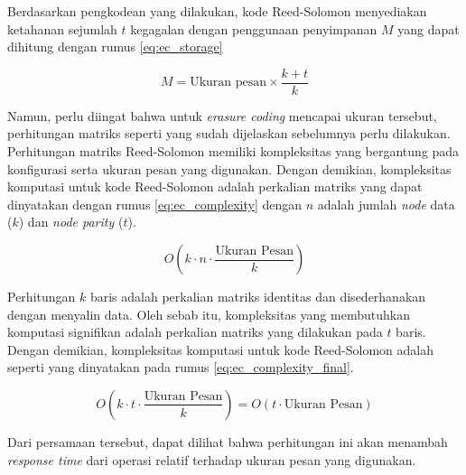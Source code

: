 Berdasarkan pengkodean yang dilakukan, kode Reed-Solomon menyediakan ketahanan sejumlah $t$ kegagalan dengan penggunaan penyimpanan $M$ yang dapat dihitung dengan rumus \ref{eq:ec_storage}

\begin{equation}
    M = \text{Ukuran pesan} \times \frac{k + t}{k}
    \label{eq:ec_storage}
\end{equation}

Namun, perlu diingat bahwa untuk \textit{erasure coding} mencapai ukuran tersebut, perhitungan matriks seperti yang sudah dijelaskan sebelumnya perlu dilakukan. Perhitungan matriks Reed-Solomon memiliki kompleksitas yang bergantung pada konfigurasi serta ukuran pesan yang digunakan. Dengan demikian, kompleksitas komputasi untuk kode Reed-Solomon adalah perkalian matriks yang dapat dinyatakan dengan rumus \ref{eq:ec_complexity} dengan $n$ adalah jumlah \textit{node} data ($k$) dan \textit{node parity} ($t$).

\begin{equation}
    O(k \cdot n \cdot \frac{\text{Ukuran Pesan}}{k})
    \label{eq:ec_complexity}
\end{equation}

Perhitungan $k$ baris adalah perkalian matriks identitas dan disederhanakan dengan menyalin data. Oleh sebab itu, kompleksitas yang membutuhkan komputasi signifikan adalah perkalian matriks yang dilakukan pada $t$ baris. Dengan demikian, kompleksitas komputasi untuk kode Reed-Solomon adalah seperti yang dinyatakan pada rumus \ref{eq:ec_complexity_final}.

\begin{equation}
    O(k \cdot t \cdot \frac{\text{Ukuran Pesan}}{k}) = O(t \cdot \text{Ukuran Pesan})
    \label{eq:ec_complexity_final}
\end{equation}

Dari persamaan tersebut, dapat dilihat bahwa perhitungan ini akan menambah \textit{response time} dari operasi relatif terhadap ukuran pesan yang digunakan.
